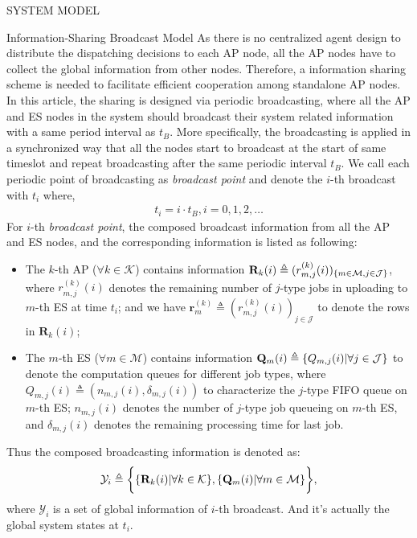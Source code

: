 \documentclass[10pt, conference, letterpaper]{IEEEtran}
\newcommand{\mat}{\mathbf}
\newcommand{\define}{\triangleq}
\renewcommand{\vec}{\mathbf}
\DeclarePairedDelimiter{\set}{\{}{\}}
\DeclarePairedDelimiter{\Brace}{\bigg\{}{\bigg\}}
\newcommand{\apSet}{\mathcal{K}}
\newcommand{\esSet}{\mathcal{M}}
\newcommand{\jSpace}{\mathcal{J}}
\newcommand{\Obsv}{\mathcal{Y}}
\begin{document}
\begin{section}{SYSTEM MODEL}
        \begin{subsection}{Information-Sharing Broadcast Model}
            As there is no centralized agent design to distribute the dispatching decisions to each AP node, all the AP nodes have to collect the global information from other nodes. Therefore, a information sharing scheme is needed to facilitate efficient cooperation among standalone AP nodes.
            In this article, the sharing is designed via periodic broadcasting, where all the AP and ES nodes in the system should broadcast their system related information with a same period interval as $t_B$. More specifically, the broadcasting is applied in a synchronized way that all the nodes start to broadcast at the start of same timeslot and repeat broadcasting after the same periodic interval $t_B$. We call each periodic point of broadcasting as \emph{broadcast point} and denote the $i$-th broadcast with $t_i$ where,
            \begin{align}
                t_i = i \cdot t_B, i=0,1,2,\dots
            \end{align}
            For $i$-th \emph{broadcast point}, the composed broadcast information from all the AP and ES nodes, and the corresponding information is listed as following:
            \begin{itemize}
                \item The $k$-th AP ($\forall k\in\apSet$) contains information $\mat{R}_k(i) \define (r^{(k)}_{m,j}(i))_{\set{m\in\esSet,j\in\jSpace}}$, where $r^{(k)}_{m,j}(i)$ denotes the remaining number of $j$-type jobs in uploading to $m$-th ES at time $t_i$; and we have $\vec{r}^{(k)}_{m} \define (r^{(k)}_{m,j}(i))_{j\in\jSpace}$ to denote the rows in $\vec{R}_k(i)$; %
                \item The $m$-th ES ($\forall m\in\esSet$) contains information $\vec{Q}_m(i) \define \set{Q_{m,j}(i)|\forall j\in\jSpace}$ to denote the computation queues for different job types, where $Q_{m,j}(i) \define (n_{m,j}(i), \delta_{m,j}(i))$ to characterize the $j$-type FIFO queue on $m$-th ES; $n_{m,j}(i)$ denotes the number of $j$-type job queueing on $m$-th ES, and $\delta_{m,j}(i)$ denotes the remaining processing time for last job.
            \end{itemize}
            Thus the composed broadcasting information is denoted as:
            \begin{align}
                \Obsv_i \define
                        \Brace{
                            \set{\mat{R}_{k}(i)|\forall k\in\apSet},
                            \set{\vec{Q}_m(i)|\forall m\in\esSet}
                        },
            \end{align}
            where $\Obsv_i$ is a set of global information of $i$-th broadcast. And it's actually the global system states at $t_i$.


\end{subsection}
\end{section}
\end{document}
